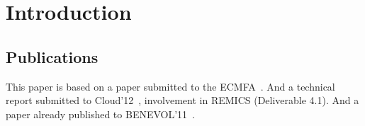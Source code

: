 \section{Introduction}


\subsection{Publications}

This paper is based on a paper submitted to the ECMFA~\cite{ecmfa4clouda}.
And a technical report submitted to Cloud'12~\cite{remics_4_1}, involvement in REMICS (Deliverable 4.1).
And a paper already published to BENEVOL'11~\cite{mosser-brandtzæg-etal:2011}.
